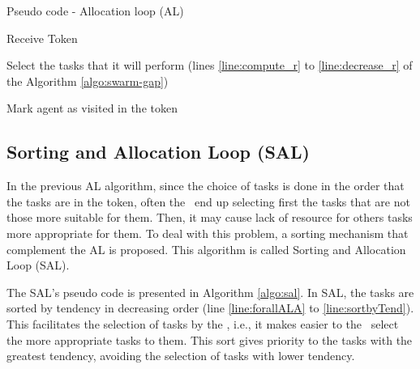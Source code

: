 \begin{algorithm}[h!t]
	\caption{Pseudo code - Allocation loop (AL)}
	\label{algo:swarm-gap-loop}
	
	\SetAlgoLined
	\DontPrintSemicolon
	\SetNlSkip{0.3em}
	
	Receive Token\; \label{line:recebe}
	
	Select the tasks that it will perform (lines \ref{line:compute_r} to \ref{line:decrease_r} of the Algorithm \ref{algo:swarm-gap}) \;
	
	Mark agent as visited in the token\; \label{line:ALini}
\end{algorithm}


\subsection{Sorting and Allocation Loop (SAL)} \label{sec:sal}

In the previous AL algorithm, since the choice of tasks is done in the order that the tasks are in the token, often the \uavs\ end up selecting first the tasks
that are not those more suitable for them. Then, it may cause lack of resource for others tasks more appropriate for them. To deal with this problem, a sorting mechanism that complement the AL is proposed. This algorithm is called Sorting and Allocation Loop (SAL).

The SAL's pseudo code is presented in Algorithm \ref{algo:sal}.
In SAL, the tasks are sorted by tendency in decreasing order (line \ref{line:forallALA} to \ref{line:sortbyTend}). This facilitates the selection of tasks by the \uavs, i.e., it makes easier to the \uavs\ select the more appropriate tasks to them. This sort gives priority to the tasks with the greatest tendency, avoiding the selection of tasks with lower tendency.

